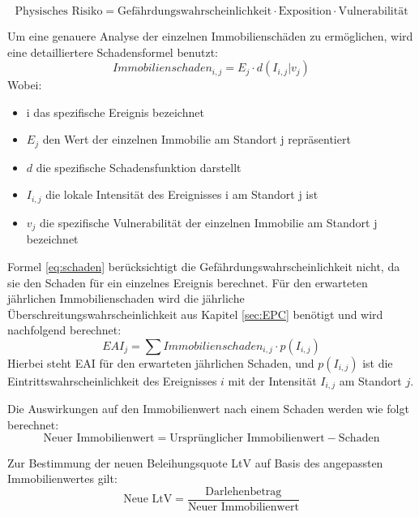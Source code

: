 \begin{equation}
    \text{Physisches Risiko} = \text{Gefährdungswahrscheinlichkeit} \cdot \text{Exposition} \cdot \text{Vulnerabilität}
\end{equation}

Um eine genauere Analyse der einzelnen Immobilienschäden zu ermöglichen, wird eine detailliertere Schadensformel \parencite{vanweddingen2023physicalrisk} benutzt:
\begin{equation}
    Immobilienschaden_{i,j} = E_j \cdot d(I_{i,j}|v_j)
    \label{eq:schaden}
\end{equation}
Wobei:
\begin{itemize}
    \item i das spezifische Ereignis bezeichnet
    \item $E_j$ den Wert der einzelnen Immobilie am Standort j repräsentiert
    \item $d$ die spezifische Schadensfunktion darstellt
    \item $I_{i,j}$ die lokale Intensität des Ereignisses i am Standort j ist
    \item $v_j$ die spezifische Vulnerabilität der einzelnen Immobilie am Standort j bezeichnet
\end{itemize}

Formel \ref{eq:schaden} berücksichtigt die Gefährdungswahrscheinlichkeit nicht, da sie den Schaden für ein einzelnes Ereignis berechnet. Für den erwarteten jährlichen Immobilienschaden wird die jährliche Überschreitungswahrscheinlichkeit aus Kapitel \ref{sec:EPC} benötigt und wird nachfolgend berechnet:
\begin{equation}
    EAI_j = \sum Immobilienschaden_{i,j} \cdot p(I_{i,j})
    \label{eq:EAI}
\end{equation}
Hierbei steht \acs{EAI} für den erwarteten jährlichen Schaden, und \( p(I_{i,j}) \) ist die Eintrittswahrscheinlichkeit des Ereignisses \( i \) mit der Intensität \( I_{i,j} \) am Standort \( j \).

Die Auswirkungen auf den Immobilienwert nach einem Schaden werden wie folgt berechnet:
\begin{equation}
    \text{Neuer Immobilienwert} = \text{Ursprünglicher Immobilienwert} - \text{Schaden}
\end{equation}

Zur Bestimmung der neuen Beleihungsquote \ac{LtV} auf Basis des angepassten Immobilienwertes gilt:
\begin{equation}
    \text{Neue LtV} = \frac{\text{Darlehenbetrag}}{\text{Neuer Immobilienwert}}
\end{equation}


